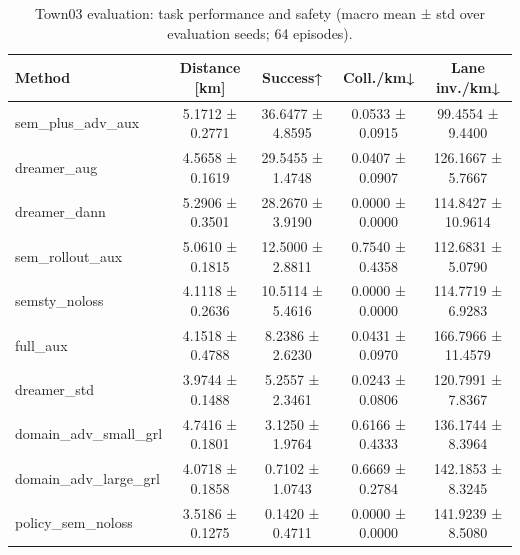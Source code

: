 \begin{table}
\caption{Town03 evaluation: task performance and safety (macro mean ± std over evaluation seeds; 64 episodes).}
\label{tab:town03_task_performance}
\begin{tabular}{lcccc}
\toprule
Method & Distance [km] & Success↑ & Coll./km↓ & Lane inv./km↓ \\
\midrule
sem_plus_adv_aux & 5.1712 ± 0.2771 & 36.6477 ± 4.8595 & 0.0533 ± 0.0915 & 99.4554 ± 9.4400 \\
dreamer_aug & 4.5658 ± 0.1619 & 29.5455 ± 1.4748 & 0.0407 ± 0.0907 & 126.1667 ± 5.7667 \\
dreamer_dann & 5.2906 ± 0.3501 & 28.2670 ± 3.9190 & 0.0000 ± 0.0000 & 114.8427 ± 10.9614 \\
sem_rollout_aux & 5.0610 ± 0.1815 & 12.5000 ± 2.8811 & 0.7540 ± 0.4358 & 112.6831 ± 5.0790 \\
semsty_noloss & 4.1118 ± 0.2636 & 10.5114 ± 5.4616 & 0.0000 ± 0.0000 & 114.7719 ± 6.9283 \\
full_aux & 4.1518 ± 0.4788 & 8.2386 ± 2.6230 & 0.0431 ± 0.0970 & 166.7966 ± 11.4579 \\
dreamer_std & 3.9744 ± 0.1488 & 5.2557 ± 2.3461 & 0.0243 ± 0.0806 & 120.7991 ± 7.8367 \\
domain_adv_small_grl & 4.7416 ± 0.1801 & 3.1250 ± 1.9764 & 0.6166 ± 0.4333 & 136.1744 ± 8.3964 \\
domain_adv_large_grl & 4.0718 ± 0.1858 & 0.7102 ± 1.0743 & 0.6669 ± 0.2784 & 142.1853 ± 8.3245 \\
policy_sem_noloss & 3.5186 ± 0.1275 & 0.1420 ± 0.4711 & 0.0000 ± 0.0000 & 141.9239 ± 8.5080 \\
\bottomrule
\end{tabular}
\end{table}
